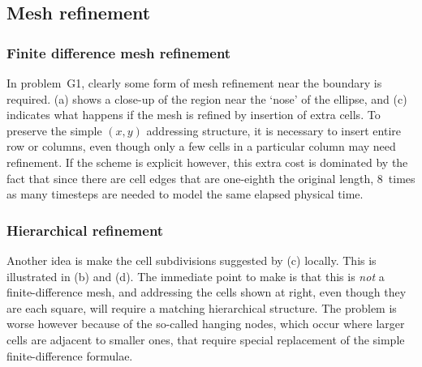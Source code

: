 \clearpage
\subsection{Mesh refinement}\label{sec:meshref}

\subsubsection{Finite difference mesh refinement}\label{sec:fdmeshref}
In problem~G1, clearly some form of mesh refinement near the boundary is required. (a) shows
a close-up of the region near the `nose' of the ellipse, and (c) indicates what happens
if the mesh is refined by insertion of extra cells. To preserve the simple $(x,y)$ addressing
structure, it is necessary to insert entire row or columns, even though only a few cells
in a particular column may need refinement. If the scheme is explicit however, this extra
cost is dominated by the fact that since there are cell edges that are one-eighth the
original length, $8$~times as many timesteps are needed to model the same elapsed physical time.

\subsubsection{Hierarchical refinement}\label{sec:hieref}
Another idea is make the cell subdivisions suggested by (c) locally. This is illustrated 
in (b) and (d).
The immediate point to make is that this is \emph{not} a finite-difference mesh, and
addressing the cells shown at right, even though they are each square, will require a
matching hierarchical structure. The problem is worse however because of the so-called
hanging nodes, which occur where larger cells are adjacent to smaller ones, that
require special replacement of the simple finite-difference formulae.

